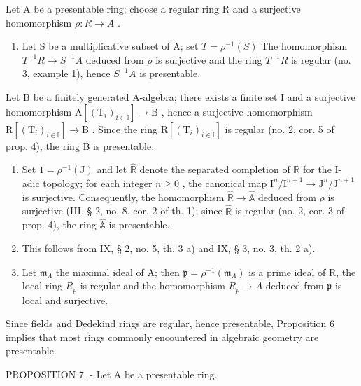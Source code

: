 Let A be a presentable ring; choose a regular ring R and a surjective homomorphism \(\rho: R \to A\) .

\begin{enumerate}
\def\labelenumi{\alph{enumi})}
\tightlist
\item
  Let S be a multiplicative subset of A; set \(T = \rho^{-1}(S)\) The homomorphism \(T^{-1}R \to S^{-1}A\) deduced from \(\rho\) is surjective and the ring \(T^{-1}R\) is regular (no. 3, example 1), hence \(S^{-1}A\) is presentable.
\end{enumerate}

Let B be a finitely generated A-algebra; there exists a finite set I and a surjective homomorphism \(\mathrm{A}[(\mathrm{T}_{i})_{i\in\mathbb{I}}]\to\mathrm{B}\) , hence a surjective homomorphism \(\mathrm{R}[(\mathrm{T}_{i})_{i\in\mathbb{I}}]\to\mathrm{B}\) . Since the ring \(\mathrm{R}[(\mathrm{T}_{i})_{i\in\mathbb{I}}]\) is regular (no. 2, cor. 5 of prop. 4), the ring B is presentable.

\begin{enumerate}
\def\labelenumi{\alph{enumi})}
\setcounter{enumi}{1}
\item
  Set \(1 = \rho^{-1}(\mathrm{J})\) and let \(\widehat{\mathbb{R}}\) denote the separated completion of \(\mathbb{R}\) for the I-adic topology; for each integer \(n \geqslant 0\) , the canonical map \(\mathrm{I}^n / \mathrm{I}^{n+1} \to \mathrm{J}^n / \mathrm{J}^{n+1}\) is surjective. Consequently, the homomorphism \(\widehat{\mathbb{R}} \to \widehat{\mathbb{A}}\) deduced from \(\rho\) is surjective (III, § 2, no. 8, cor. 2 of th. 1); since \(\widehat{\mathbb{R}}\) is regular (no. 2, cor. 3 of prop. 4), the ring \(\widehat{\mathbb{A}}\) is presentable.
\item
  This follows from IX, § 2, no. 5, th. 3 a) and IX, § 3, no. 3, th. 2 a).
\item
  Let \(\mathfrak{m}_{\Lambda}\) the maximal ideal of A; then \(\mathfrak{p} = \mathfrak{\rho}^{-1}(\mathfrak{m}_{\Lambda})\) is a prime ideal of R, the local ring \(R_{p}\) is regular and the homomorphism \(R_{p} \to A\) deduced from \(\mathfrak{p}\) is local and surjective.
\end{enumerate}

Since fields and Dedekind rings are regular, hence presentable, Proposition 6 implies that most rings commonly encountered in algebraic geometry are presentable.

PROPOSITION 7. - Let A be a presentable ring.

